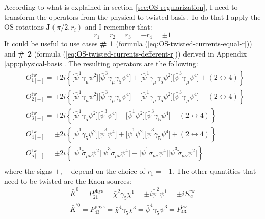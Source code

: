 \documentclass[english, LaM, oneside, noexaminfo]{sapthesis}
\begin{document}
According to what is explained in section \ref{sec:OS-regularization}, I need to transform the operators from the physical to twisted basis.
To do that I apply the OS rotations $\mathbf{J}(\pi/2,r_i)$ and I remember that:
\begin{equation*}
    r_1 = r_2 = r_3 = - r_4 = \pm 1
\end{equation*}
It could be useful to use cases {\bf \# 1} (formula (\ref{eq:OS-twisted-currents-equal-r})) and {\bf \# 2} (formula (\ref{eq:OS-twisted-currents-defferent-r})) derived in Appendix \ref{app:physical-basis}.
The resulting operators are the following:
\begin{equation}\label{eq:O_i-operators-twisted-final}
    \begin{split}
        & O_{1[+]}^\text{tw} = \mp 2i \left\{\big[\bar\psi^1 \gamma_\mu \psi^2 \big] \big[\bar\psi^3 \gamma_\mu \gamma_5 \psi^4 \big] + \big[ \bar\psi^1 \gamma_\mu \gamma_5 \psi^2 \big] \big[ \bar\psi^3 \gamma_\mu \psi^4 \big] + \left(2\leftrightarrow 4\right)\right\} \\
        & O_{2[+]}^\text{tw} = \mp 2i \left\{\big[\bar\psi^1 \gamma_\mu \psi^2 \big] \big[\bar\psi^3 \gamma_\mu \gamma_5 \psi^4 \big] - \big[ \bar\psi^1 \gamma_\mu \gamma_5 \psi^2 \big] \big[ \bar\psi^3 \gamma_\mu \psi^4 \big] - \left(2\leftrightarrow 4\right)\right\} \\
        & O_{3[+]}^\text{tw} = \pm 2i \left\{\big[\bar\psi^1 \gamma_5 \psi^2 \big] \big[ \bar\psi^3 \psi^4 \big] - \big[ \bar\psi^1 \psi^2 \big] \big[ \bar\psi^3 \gamma_5 \psi^4\big] - \left(2\leftrightarrow 4\right)\right\} \\
        & O_{4[+]}^\text{tw} = \pm 2i \left\{\big[\bar\psi^1 \gamma_5 \psi^2 \big] \big[ \bar\psi^3 \psi^4 \big] + \big[ \bar\psi^1 \psi^2 \big] \big[ \bar\psi^3 \gamma_5 \psi^4\big] + \left(2\leftrightarrow 4\right)\right\} \\
        & O_{5[+]}^\text{tw} = \pm 2i \left\{\big[\bar\psi^1 \tilde\sigma_{\mu\nu} \psi^2 \big] \big[ \bar\psi^3 \sigma_{\mu\nu} \psi^4 \big] + \big[\bar\psi^1 \sigma_{\mu\nu} \psi^4 \big] \big[ \bar\psi^3 \tilde\sigma_{\mu\nu} \psi^2 \big] \right\} \\
    \end{split}
\end{equation}
where the signs $\pm,\mp$ depend on the choice of $r_1=\pm1$.
The other quantities that need to be twisted are the Kaon sources:
\begin{equation}\label{eq:kaon-sources}
    \begin{gathered}
        \bar K^{0} = P^\text{phys}_{21} = \bar\chi^2 \gamma_5 \chi^1 = \pm i \bar\psi^2 \psi^1 = \pm i S^\text{tw}_{21} \\
        \bar K^{'0} = P^\text{phys}_{43} = \bar\chi^4 \gamma_5 \chi^3 = \bar\psi^4 \gamma_5 \psi^3 = P^\text{tw}_{43} \\
    \end{gathered}
\end{equation}
\end{document}
